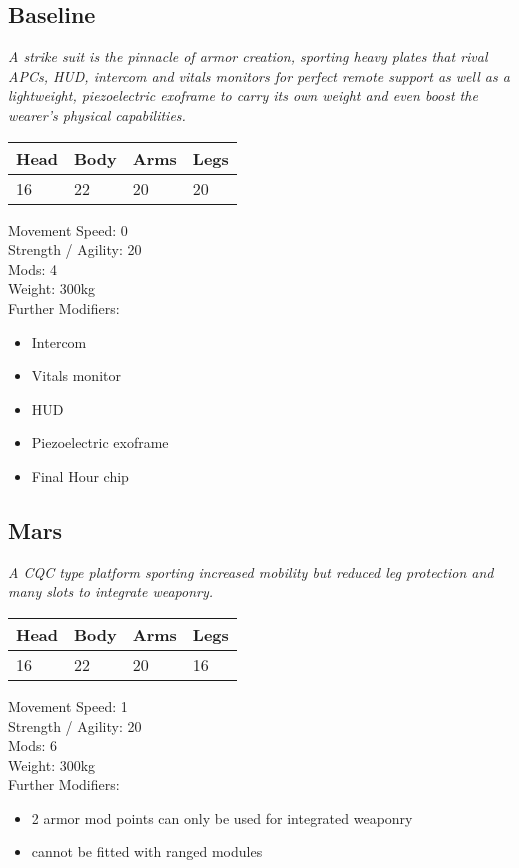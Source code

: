 \documentclass[12pt,a4paper,openany]{book}
\begin{document}
	\subsection{Baseline}
	\textit{A strike suit is the pinnacle of armor creation, sporting heavy plates that rival APCs, HUD, intercom and vitals monitors for perfect remote support as well as a lightweight, piezoelectric exoframe to carry its own weight and even boost the wearer's physical capabilities.}\par
	\begin{tabular}{|l|l|l|l|}
		\hline
		Head & Body & Arms & Legs\\
		\hline
		16 & 22 & 20 & 20\\
		\hline
	\end{tabular}
	\par
	Movement Speed: 0\\
	Strength / Agility: 20\\
	Mods: 4\\
	Weight: 300kg\\
	Further Modifiers:
	\vspace{-8mm}
	\begin{itemize}
		\setlength\itemsep{-8mm}
		\item Intercom
		\item Vitals monitor
		\item HUD
		\item Piezoelectric exoframe
		\item Final Hour chip
	\end{itemize}
	\par
	\subsection{Mars}
	\textit{A CQC type platform sporting increased mobility but reduced leg protection and many slots to integrate weaponry.}\par
	\begin{tabular}{|l|l|l|l|}
		\hline
		Head & Body & Arms & Legs\\
		\hline
		16 & 22 & 20 & 16\\
		\hline
	\end{tabular}
	\par
	Movement Speed: 1\\
	Strength / Agility: 20\\
	Mods: 6\\
	Weight: 300kg\\
	Further Modifiers:
	\vspace{-8mm}
	\begin{itemize}
		\setlength\itemsep{-8mm}
		\item 2 armor mod points can only be used for integrated weaponry
		\item cannot be fitted with ranged modules
	\end{itemize}
	\par
\end{document}
